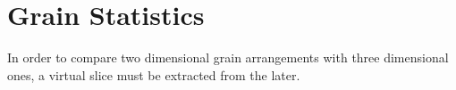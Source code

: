 \chapter{Grain Statistics}

In order to compare two dimensional grain arrangements with three dimensional ones, a virtual slice must be extracted from the later. \cite{schneider2012nih}